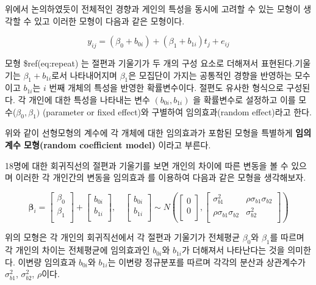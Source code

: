 \documentclass[
]{book}
\theoremstyle{definition}
\theoremstyle{definition}
\theoremstyle{definition}
\theoremstyle{remark}
\begin{document}
위에서 논의하였듯이 전체적인 경향과 게인의 특성을 동시에 고려할 수 있는 모형이 생각할 수 있고 이러한 모형이 다음과 같은 모형이다.

\begin{equation} 
y_{ij} = (\beta_0 + b_{0i}) + (\beta_1 + b_{1i}) t_j + e_{ij} 
\label{eq:repeat}
\end{equation}

모형 \$ref(eq:repeat) 는 절편과 기울기가 두 개의 구성 요소로 더해져서 표현된다.기울기는 \(\beta_1+b_{1i}\)로서 나타내어지며 \(\beta_1\)은 모집단이 가지는 공통적인 경향을 반영하는 모수이고 \(b_{1i}\)는 \(i\) 번째 개체의 특성을 반영한 확률변수이다. 절편도 유사한 형식으로 구성된다.
각 개인에 대한 특성을 나타내는 변수 \((b_{0i}, b_{1i})\) 을 확률변수로 설정하고 이를 모수(\(\beta_0, \beta_1)\) (parameter or fixed effect)와 구별하여 임의효과(random effect)라고 한다.

위와 같이 선형모형의 계수에 각 개체에 대한 임의효과가 포함된 모형을 특별하게
\textbf{임의 계수 모형(random coefficient model)} 이라고 부른다.

18명에 대한 회귀직선의 절편과 기울기를 보면 개인의 차이에 따른 변동을 볼 수 있으며 이러한 각 개인간의 변동을 임의효과 를 이용하여 다음과 같은 모형을 생각해보자.

\[
\bm \beta_i=
\left[ \begin{array}{c}
\beta_{0} \\
\beta_{1} \\
\end{array} \right]
+\left[ \begin{array}{c}
b_{0i} \\
b_{1i} \\
\end{array} \right]
, \quad
\left[ \begin{array}{c}
b_{0i} \\
b_{1i} \\
\end{array} \right] \sim
N \left (
\left[ \begin{array}{c}
0 \\
0 \\
\end{array} \right]
,
\left[ \begin{array}{cc}
\sigma^2_{b1} & \rho \sigma_{b1} \sigma_{b2}\\
\rho \sigma_{b1} \sigma_{b2} & \sigma^2_{b2} \\
\end{array} \right]
\right )
\]

위의 모형은 각 개인의 회귀직선에서 각 절편과 기울기가 전체평균 \(\beta_0\)와 \(\beta_1\)를 따르며 각 개인의 차이는 전체평균에 임의효과인 \(b_{0i}\)와 \(b_{1i}\)가 더해져서 나타난다는 것을 의미한다. 이변량 임의효과 \(b_{0i}\)와 \(b_{1i}\)는 이변량 정규분포를 따르며 각각의 분산과 상관계수가 \(\sigma^2_{b1}\), \(\sigma^2_{b2}\), \(\rho\)이다.
\end{document}

